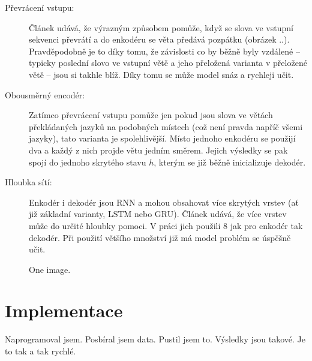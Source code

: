\begin{description}
  \item[Převrácení vstupu:] Článek \cite{seq2seq} udává, že výrazným způsobem pomůže, když se slova ve vstupní sekvenci převrátí a do enkodéru  se věta předává pozpátku (obrázek ..).  Pravděpodobně je to díky tomu, že závislosti co by běžně byly vzdálené -- typicky poslední slovo ve vstupní větě a jeho přeložená varianta v přeložené větě -- jsou si takhle blíž. Díky tomu se může model snáz a rychleji učit.
  \item[Obousměrný encodér:] Zatímco převrácení vstupu pomůže jen pokud jsou slova ve větách překládaných jazyků na podobných místech (což není pravda napříč všemi jazyky), tato varianta je spolehlivější. Místo jednoho enkodéru se použijí dva a každý z nich projde větu jedním směrem. Jejich výsledky se pak spojí do jednoho skrytého stavu $h$, kterým se již běžně inicializuje dekodér.
  \item[Hloubka sítí:] Enkodér i dekodér jsou RNN a mohou obsahovat více skrytých vrstev (ať již základní varianty, LSTM nebo GRU). Článek \cite{googleBridgingGap} udává, že více vrstev může do určité hloubky pomoci. V práci jich použili 8 jak pro enkodér tak dekodér. Při použití většího množství již má model problém se úspěšně učit.
\end{description}

\begin{figure}
    \begin{center}
    \end{center}
	\caption{One image. }
	\label{img:TODO}
\end{figure}



\chapter{Implementace}
Naprogramoval jsem.
Posbíral jsem data.
Pustil jsem to.
Výsledky jsou takové.
Je to tak a tak rychlé.


